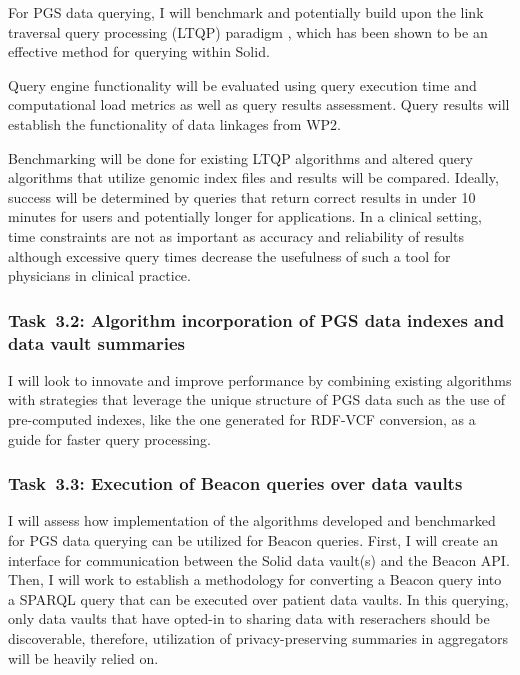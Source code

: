 \documentclass[a4paper,11pt]{article}
\begin{document}
\begin{refsection}
For PGS data querying, I will benchmark and potentially build upon the link traversal query processing (LTQP) paradigm \cite{taelman_evaluation_2023}, which has been shown to be an effective method for querying within Solid.  


Query engine functionality will be evaluated using query execution time and computational load metrics as well as query results assessment. 
Query results will establish the functionality of data linkages from WP2.

Benchmarking will be done for existing LTQP algorithms and altered query algorithms that utilize genomic index files and results will be compared.
Ideally, success will be determined by queries that return correct results in under 10 minutes for users and potentially longer for applications.
In a clinical setting, time constraints are not as important as accuracy and reliability of results although excessive query times decrease the usefulness of such a tool for physicians in clinical practice.



\newcommand\WPcb{Algorithm incorporation of PGS data indexes and data vault summaries}
\subsubsection{Task~3.2: \WPcb}

I will look to innovate and improve performance by combining existing algorithms with strategies that leverage the unique structure of PGS data such as the use of pre-computed indexes, like the one generated for RDF-VCF conversion, as a guide for faster query processing.


\newcommand\WPcc{Execution of Beacon queries over data vaults}
\subsubsection{Task~3.3: \WPcc}

I will assess how implementation of the algorithms developed and benchmarked for PGS data querying can be utilized for Beacon queries. 
First, I will create an interface for communication between the Solid data vault(s) and the Beacon API. 
Then, I will work to establish a methodology for converting a Beacon query into a SPARQL query that can be executed over patient data vaults.
In this querying, only data vaults that have opted-in to sharing data with reserachers should be discoverable, therefore, utilization of privacy-preserving summaries in aggregators will be heavily relied on.




\end{refsection}
\end{document}
